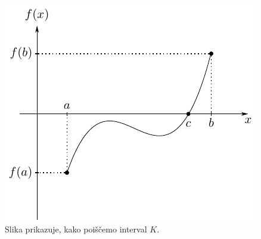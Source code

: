 \documentclass[mat2]{fmfdelo}
\begin{document}
\begin{figure}[h]
  \centering
  \includegraphics[]{images/intermediate.pdf}
  \caption[Primer vektorske slike.]{Slika prikazuje, kako poiščemo interval $K$.}
  \label{fig:bezje}
\end{figure}
\end{document}

